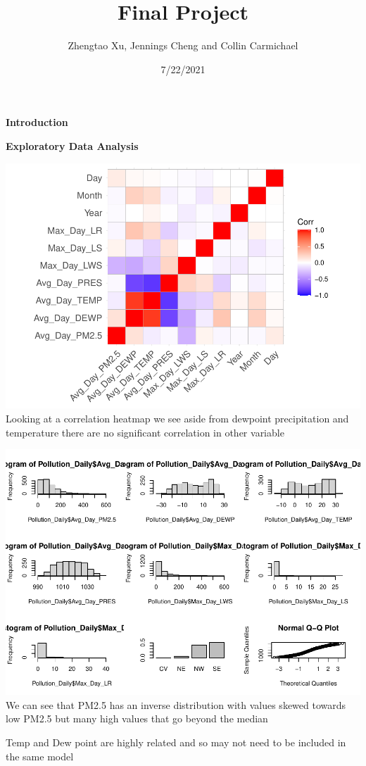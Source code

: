 \documentclass[
]{article}
\title{Final Project}
\author{Zhengtao Xu, Jennings Cheng and Collin Carmichael}
\date{7/22/2021}
\begin{document}
\maketitle

\textbf{Introduction}

\textbf{Exploratory Data Analysis}

\includegraphics{Final_Project_1_files/figure-latex/unnamed-chunk-3-1.pdf}
Looking at a correlation heatmap we see aside from dewpoint
precipitation and temperature there are no significant correlation in
other variable

\includegraphics{Final_Project_1_files/figure-latex/unnamed-chunk-4-1.pdf}
We can see that PM2.5 has an inverse distribution with values skewed
towards low PM2.5 but many high values that go beyond the median

Temp and Dew point are highly related and so may not need to be included
in the same model
\end{document}
